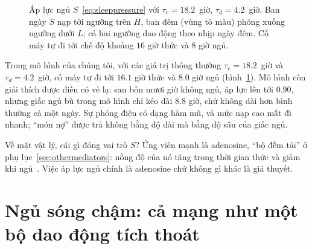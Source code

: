\begin{figure}[t]
\centering
{}
\caption{Áp lực ngủ $S$~\eqref{eq:sleeppressure} với $\tau_r=18.2$~giờ, $\tau_d=4.2$~giờ. Ban ngày $S$ nạp tới ngưỡng trên $H$, ban đêm (vùng tô màu) phóng xuống ngưỡng dưới $L$; cả hai ngưỡng dao động theo nhịp ngày đêm. Cỗ máy tự đi tới chế độ khoảng $16$ giờ thức và $8$ giờ ngủ.}
\label{fig:twoprocess}
\end{figure}

Trong mô hình của chúng tôi, với các giá trị thông thường $\tau_r=18.2$~giờ và $\tau_d=4.2$~giờ, cỗ máy tự đi tới $16.1$ giờ thức và $8.0$ giờ ngủ (hình~\ref{fig:twoprocess}). Mô hình còn giải thích được điều có vẻ lạ: sau bốn mươi giờ không ngủ, áp lực lên tới $0.90$, nhưng giấc ngủ bù trong mô hình chỉ kéo dài $8.8$ giờ, chứ không dài hơn bình thường cả một ngày. Sự phóng điện có dạng hàm mũ, và mức nạp cao mất đi nhanh; ``món nợ'' được trả không bằng độ dài mà bằng độ sâu của giấc ngủ.

Về mặt vật lý, cái gì đóng vai trò $S$? Ứng viên mạnh là adenosine, ``bộ đếm tải'' ở phụ lục~\ref{sec:othermediators}: nồng độ của nó tăng trong thời gian thức và giảm khi ngủ~\cite{PorkkaHeiskanen1997,Dunwiddie2001}. Việc áp lực ngủ chính là adenosine chứ không gì khác là giả thuyết.

\section{Ngủ sóng chậm: cả mạng như một bộ dao động tích thoát}

